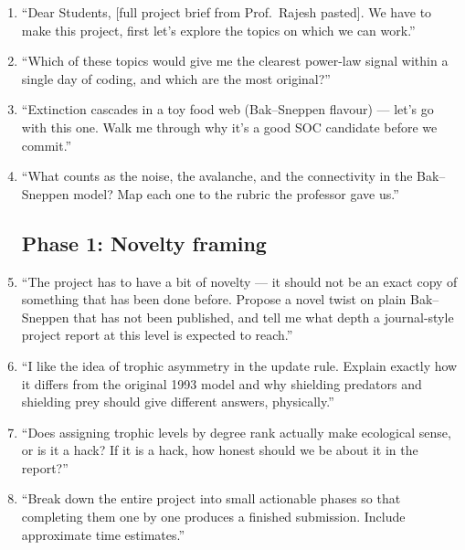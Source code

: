 \documentclass[10pt,a4paper,twocolumn]{article}
\begin{document}
\begin{enumerate}
\item ``Dear Students, [full project brief from Prof.\ Rajesh pasted]. We have to make this project, first let's explore the topics on which we can work.''
\item ``Which of these topics would give me the clearest power-law signal within a single day of coding, and which are the most original?''
\item ``Extinction cascades in a toy food web (Bak--Sneppen flavour) --- let's go with this one. Walk me through why it's a good SOC candidate before we commit.''
\item ``What counts as the noise, the avalanche, and the connectivity in the Bak--Sneppen model? Map each one to the rubric the professor gave us.''

\subsection*{Phase 1: Novelty framing}
\item ``The project has to have a bit of novelty --- it should not be an exact copy of something that has been done before. Propose a novel twist on plain Bak--Sneppen that has not been published, and tell me what depth a journal-style project report at this level is expected to reach.''
\item ``I like the idea of trophic asymmetry in the update rule. Explain exactly how it differs from the original 1993 model and why shielding predators and shielding prey should give different answers, physically.''
\item ``Does assigning trophic levels by degree rank actually make ecological sense, or is it a hack? If it is a hack, how honest should we be about it in the report?''
\item ``Break down the entire project into small actionable phases so that completing them one by one produces a finished submission. Include approximate time estimates.''


\end{enumerate}
\end{document}
